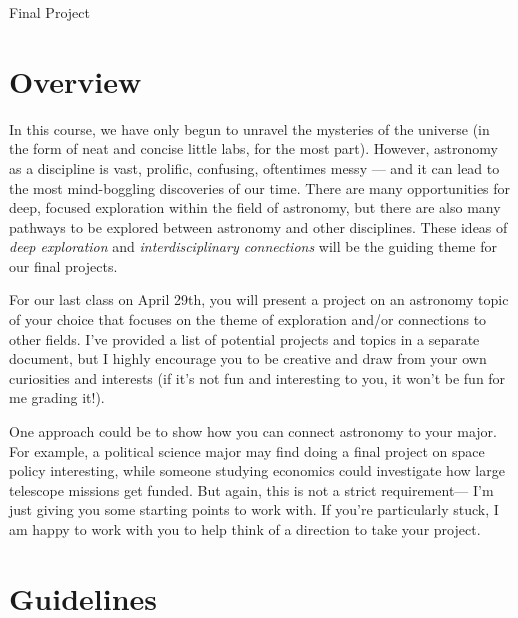 \documentclass[12pt]{article}
\begin{document}
\thispagestyle{empty}

\begin{center}
\huge{Final Project}\\ \medskip 
\end{center}

\section{Overview}
In this course, we have only begun to unravel the mysteries of the universe (in the form of neat and concise little labs, for the most part). However, astronomy as a discipline is vast, prolific, confusing, oftentimes messy — and it can lead to the most mind-boggling discoveries of our time. There are many opportunities for deep, focused exploration within the field of astronomy, but there are also many pathways to be explored between astronomy and other disciplines. These ideas of \textit{deep exploration} and \textit{interdisciplinary connections} will be the guiding theme for our final projects.

For our last class on April 29th, you will present a project on an astronomy topic of your choice that focuses on the theme of exploration and/or connections to other fields. I've provided a list of potential projects and topics in a separate document, but I highly encourage you to be creative and draw from your own curiosities and interests (if it's not fun and interesting to you, it won't be fun for me grading it!).

One approach could be to show how you can connect astronomy to your major. For example, a political science major may find doing a final project on space policy interesting, while someone studying economics could investigate how large telescope missions get funded. But again, this is not a strict requirement— I'm just giving you some starting points to work with. If you're particularly stuck, I am happy to work with you to help think of a direction to take your project.

\section{Guidelines}
\end{document}
